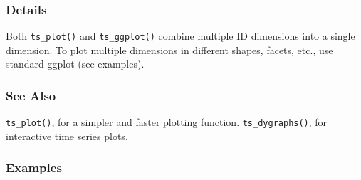 \documentclass[
  letterpaper,
  DIV=11,
  numbers=noendperiod]{scrreport}
\begin{document}
\subsubsection{Details}\label{details-18}

Both \texttt{ts\_plot()} and \texttt{ts\_ggplot()} combine multiple ID
dimensions into a single dimension. To plot multiple dimensions in
different shapes, facets, etc., use standard ggplot (see examples).

\subsubsection{See Also}\label{see-also-3}

\texttt{ts\_plot()}, for a simpler and faster plotting function.
\texttt{ts\_dygraphs()}, for interactive time series plots.

\subsubsection{Examples}\label{examples-60}
\end{document}
